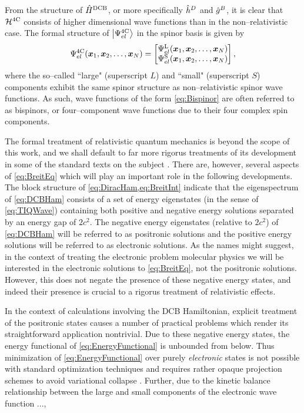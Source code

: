 From the structure of $\hat{H}^{\mathrm{DCB}}$, or more specifically  $\hat{h}^D$ and $\hat{g}^B$, it is clear that $\mathcal{H}^{\mathrm{4C}}$
consists of higher dimensional wave functions than in the non--relativistic case. 
The formal structure of $\left\vert \Psi_{el}^{\mathrm{4C}} \right\rangle$ in the spinor basis is given by 
\begin{equation}
  \label{eq:Bispinor}
  \Psi_{el}^{\mathrm{4C}}(\boldsymbol{x}_1,\boldsymbol{x}_2,\ldots,\boldsymbol{x}_N) = 
    \begin{bmatrix}
       \Psi_{el}^\mathrm{L}(\boldsymbol{x}_1,\boldsymbol{x}_2,\ldots,\boldsymbol{x}_N) \\
       \Psi_{el}^\mathrm{S}(\boldsymbol{x}_1,\boldsymbol{x}_2,\ldots,\boldsymbol{x}_N) 
    \end{bmatrix},
\end{equation}
where the so--called ``large" (superscript $L$) and ``small" (superscript $S$) components exhibit the same spinor
structure as non--relativistic spinor wave functions. As such, wave functions of the form \cref{eq:Bispinor} are often
referred to as bispinors, or four--component wave functions due to their four complex spin components.

The formal treatment of relativistic quantum mechanics is beyond the scope of this work, and we shall default to far
more rigorus treatments of its development in some of the standard texts on the subject . There are, however,
several aspects of \cref{eq:BreitEq} which will play an important role in the following developments. The block structure
of \cref{eq:DiracHam,eq:BreitInt} indicate that the eigenspectrum of \cref{eq:DCBHam} consists of a set of energy
eigenstates (in the sense of \cref{eq:TIQWave}) containing both positive and negative energy solutions separated
by an energy gap of $2c^2$.
The negative energy eigenstates (relative to $2c^2$)  of \cref{eq:DCBHam} will be referred to as positronic
solutions and the positive energy solutions will be referred to as electronic solutions. As the names might suggest,
in the context of treating the electronic problem molecular physics we will be interested in the electronic solutions to \cref{eq:BreitEq}, not
the positronic solutions. However, this does not negate the presence of these negative energy states, and indeed their presence is
crucial to a rigorus treatment of relativistic effects. 

In the context of calculations involving the DCB Hamiltonian, explicit treatment of the positronic states causes a number of practical
problems which render its straightforward application nontrivial. Due to these negative energy states, the energy functional of
\cref{eq:EnergyFunctional} is unbounded from below. Thus minimization of \cref{eq:EnergyFunctional} over purely \emph{electronic}
states is not possible with standard optimization techniques and requires rather opaque projection schemes to avoid variational
collapse . Further, due to the kinetic balance relationship between the large and small components of the 
electronic wave function ...,





